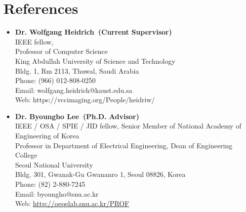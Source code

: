 \documentclass[10pt,a4paper]{moderncv}
\begin{document}


\section{References}
\begin{itemize}
\item \textbf{Dr. Wolfgang Heidrich~(Current Supervisor)} \\
    IEEE fellow, \\
    Professor of Computer Science\\
    King Abdullah University of Science and Technology \\
    Bldg. 1, Rm 2113, Thuwal, Saudi Arabia \\
    Phone: (966) 012-808-0250 \\
    Email: wolfgang.heidrich@kaust.edu.sa \\
    Web: {https://vccimaging.org/People/heidriw/}
\end{itemize} 
\vspace{6pt}

\begin{itemize}
\item \textbf{Dr. Byoungho Lee~(Ph.D. Advisor)}  \\
    IEEE / OSA / SPIE / JID fellow, Senior Member of National Academy of Engineering of Korea  \\
    Professor in Department of Electrical Engineering, Dean of Engineering College  \\
    Seoul National University  \\
    Bldg. 301, Gwanak-Gu Gwananro 1, Seoul 08826, Korea \\
    Phone: (82) 2-880-7245  \\
    Email: byoungho@snu.ac.kr  \\
    Web: \href{http://oeqelab.snu.ac.kr/PROF}{http://oeqelab.snu.ac.kr/PROF}
\end{itemize}  
\vspace{6pt}
\end{document}
